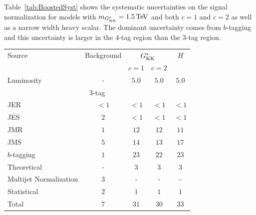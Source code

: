 Table~\ref{tab:BoostedSyst} shows the systematic uncertainties on the signal normalization for models with $m_{\Gkk} = 1.5 \TeV$ and both $c = 1$ and $c = 2$ as well as a narrow width heavy scalar. The dominant uncertainty comes from $b$-tagging and this uncertainty is larger in the $4$-tag region than the $3$-tag region. 

\begin{table}[ht!]
\begin{center} 
\begin{tabular}{  l  c  c  c  c }
\toprule
 Source          & Background    & \multicolumn{2}{c}{$G^*_{\rm KK}$} & $H$ \\
                 &         & $c = 1$ & $c = 2$  &     \\
\midrule
   Luminosity    &  -      &  $5.0$    &  $5.0$    & $5.0$ \\
\midrule
                \multicolumn{5}{c}{$3$-tag}  \\
\midrule
   JER           &  $<1$   &  $< 1$   &  $<1$   & $< 1$ \\
   JES           &  $2$    &  $<1$    &  $< 1$    & $<1$ \\
   JMR           &  $1$    &  $12$   &  $12$   & $11$  \\
   JMS           &  $5$    &  $14$   &  $13$   & $17$  \\
   $b$-tagging   &  $1$   &  $23$   &  $22$   & $23$  \\
   Theoretical   &  -      &  $3$    &  $3$    & $3$ \\
   Multijet Normalization      &  $3$    &  -      &  -      &  -  \\
   Statistical     &  $2$    &  $1$      &  $1$      &  $1$  \\
   \midrule
   Total         &  $7$    &  $31$   &  $30$   &  $33$ \\

\end{tabular}
\end{center}
\end{table}
